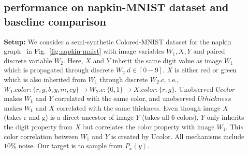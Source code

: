 \documentclass{article}
\newcommand{\red}{\textcolor{red}}
\newcommand{\idgen}{\text{ID-GEN}\xspace}
\theoremstyle{plain}
\theoremstyle{definition}
\theoremstyle{remark}
\begin{document}
\subsection{\idgen performance on napkin-MNIST dataset and baseline comparison}
\label{sec:napkin-mnist}
\textbf{Setup:} 
%
We consider a semi-synthetic Colored-MNIST dataset for the napkin graph~\citep{pearl2018book}
in Fig.~\ref{fig:napkin-mnist} with image variables $W_1, X, Y$ and paired discrete variable $W_2$.
%
%
Here, $X$ and $Y$ inherit the same digit value as image $W_1$ which is propagated through discrete $W_2.d \in [0-9]$. $X$ is either red or green which is also inherited from $W_1$ through discrete $W_2.c$, i.e., $W_1.color:\{r, g, b, y, m, cy\} \rightarrow W_2.c:\{0, 1\} \rightarrow X.color:\{r, g\}$. 
Unobserved $Ucolor$ makes $W_1$ and $Y$ correlated with the same color, and unobserved $Uthickness$ makes $W_1$ and $X$ correlated with the same thickness. 
Even though image $X$ (takes r and g) is a direct ancestor of image $Y$ (takes all 6 colors), ${Y}$ only inherits the digit property from $X$ but correlates the color property with image ${W}_1$. This color correlation between ${W}_1$ and ${Y}$ is created by Ucolor.
All mechanisms include $10\%$ noise. Our target is to sample from $P_x(y)$.
%
\end{document}
